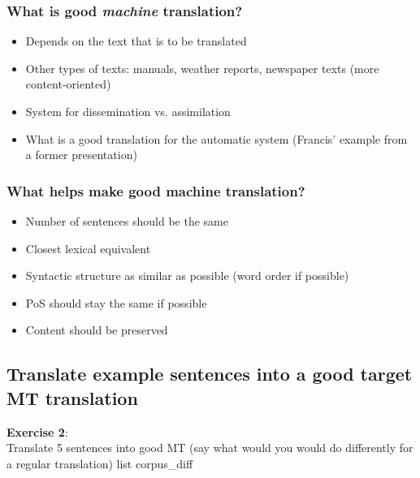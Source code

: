 \documentclass[a4paper,english,12pt]{article}
\begin{document}
\subsubsection{What is good \emph{machine} translation?}

\begin{itemize}
  \item Depends on the text that is to be translated
  \item Other types of texts: manuals, weather reports, newspaper texts (more content-oriented)
  \item System for dissemination vs. assimilation
  \item What is a good translation for the automatic system (Francis' example from a former presentation)
\end{itemize}

\subsubsection{What helps make good machine translation?}

\begin{itemize}
  \item Number of sentences should be the same
  \item Closest lexical equivalent
  \item Syntactic structure as similar as possible (word order if possible)
  \item PoS should stay the same if possible
  \item Content should be preserved
\end{itemize}

\subsection{Translate example sentences into a good target MT translation}

{\bf Exercise 2}:\\
Translate 5 sentences into good MT (say what would you would do differently for a regular translation)
list corpus\_diff

\end{document}
